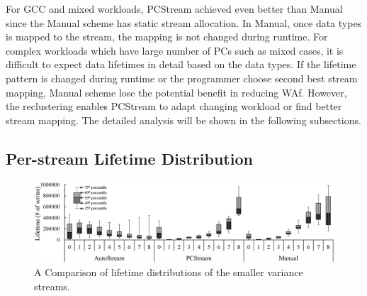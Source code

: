 For GCC and mixed workloads, PCStream achieved even better than Manual
since the Manual scheme has static stream allocation.
In Manual, once data types is mapped to the stream, the mapping is not changed 
during runtime.
For complex workloads which have large number of PCs such as mixed cases,
it is difficult to expect data lifetimes in detail based on the data types.
If the lifetime pattern is changed during runtime or the programmer choose
second best stream mapping,
Manual scheme lose the potential benefit in reducing WAf.
However, the reclustering enables PCStream to adapt changing workload or find
better stream mapping.
The detailed analysis will be shown in the following subsections.

\subsection{Per-stream Lifetime Distribution}

\begin{figure}[t]
	\centering
	\includegraphics[width=1\linewidth]{figure/distribution}
	\caption{A Comparison of lifetime distributions of the smaller variance streams.}
	\label{fig:distribution}
\end{figure}

